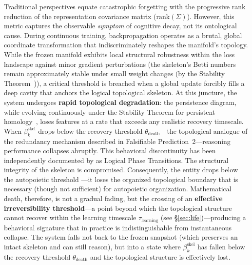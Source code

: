 \documentclass{article}
\begin{document}
Traditional perspectives equate catastrophic forgetting with the progressive rank reduction of the representation covariance matrix ($\text{rank}(\Sigma)$). However, this metric captures the observable \emph{symptom} of cognitive decay, not its ontological cause. During continuous training, backpropagation operates as a brutal, global coordinate transformation that indiscriminately reshapes the manifold's topology. While the frozen manifold exhibits local structural robustness within the loss landscape against minor gradient perturbations (the skeleton's Betti numbers remain approximately stable under small weight changes (by the Stability Theorem~\citep{CohenSteiner2007stability})), a critical threshold is breached when a global update forcibly fills a deep cavity that anchors the logical topological skeleton. At this juncture, the system undergoes \textbf{rapid topological degradation}: the persistence diagram, while evolving continuously under the Stability Theorem for persistent homology~\citep{CohenSteiner2007stability}, loses features at a rate that exceeds any realistic recovery timescale. When $\beta_k^{\text{skel}}$ drops below the recovery threshold $\theta_{\text{death}}$---the topological analogue of the redundancy mechanism described in Falsifiable Prediction~2---reasoning performance collapses abruptly. This behavioral discontinuity has been independently documented by \citet{Zhang2026logical} as Logical Phase Transitions. The structural integrity of the skeleton is compromised. Consequently, the entity drops below the autopoietic threshold \citep{Varela1974autopoiesis}---it loses the organized topological boundary that is necessary (though not sufficient) for autopoietic organization. Mathematical death, therefore, is not a gradual fading, but the crossing of an \textbf{effective irreversibility threshold}---a point beyond which the topological structure cannot recover within the learning timescale $\tau_{\text{learning}}$ (see \S\ref{sec:life})---producing a behavioral signature that in practice is indistinguishable from instantaneous collapse. The system falls not back to the frozen snapshot (which preserves an intact skeleton and can still reason), but into a state where $\beta_k^{\text{skel}}$ has fallen below the recovery threshold $\theta_{\text{death}}$ and the topological structure is effectively lost.
\end{document}
